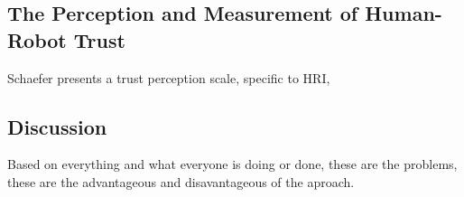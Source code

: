 \subsection{The Perception and Measurement of Human-Robot Trust}

Schaefer\cite{Schaefer2009} presents a trust perception scale, specific to \ac{HRI}, 





\subsection{Discussion}
\label{subsec:RelWorkDiscussion}

Based on everything and what everyone is doing or done, these are the problems, these are the advantageous and disavantageous of the aproach.
